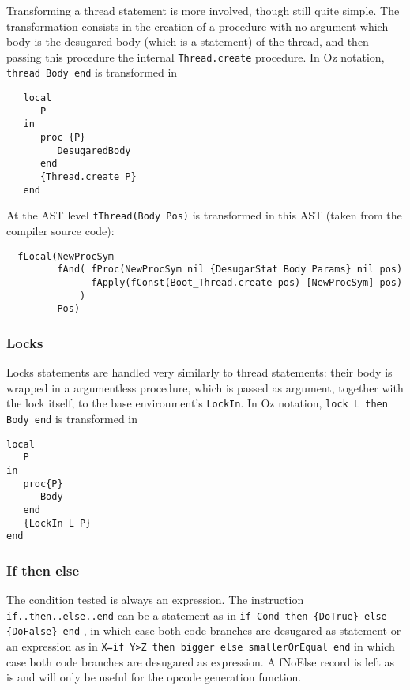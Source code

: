 \documentclass[a4paper]{memoir}
\begin{document}
Transforming a thread statement is more involved, though still quite simple. The transformation consists in the creation of a procedure with no argument which body is the desugared body (which is a statement) of the thread, and then passing this procedure the internal \lstinline!Thread.create! procedure.
In Oz notation, \lstinline!thread Body end! is transformed in 
\begin{lstlisting}
   local 
      P 
   in 
      proc {P} 
         DesugaredBody 
      end 
      {Thread.create P}
   end
\end{lstlisting}
At the AST level \lstinline!fThread(Body Pos)! is transformed in this AST (taken from the compiler source code):
\begin{lstlisting}
  fLocal(NewProcSym 
         fAnd( fProc(NewProcSym nil {DesugarStat Body Params} nil pos) 
               fApply(fConst(Boot_Thread.create pos) [NewProcSym] pos)
             ) 
         Pos)
\end{lstlisting}

\subsubsection{Locks}
Locks statements are handled very similarly to thread statements: their body is
wrapped in a argumentless procedure, which is passed as argument, together with
the lock itself, to the base environment's \lstinline!LockIn!. In Oz notation, \lstinline!lock L then Body end! is transformed in
\begin{lstlisting}
local
   P
in
   proc{P}
      Body
   end
   {LockIn L P}
end
\end{lstlisting}


\subsubsection{If then else}
The condition tested is always an expression.
The instruction \lstinline!if..then..else..end! can be a statement as in 
\lstinline!if Cond then {DoTrue} else {DoFalse} end!
, in which case both code branches are desugared as statement
or an expression as in
\lstinline!X=if Y>Z then bigger else smallerOrEqual end!
in which case both code branches are desugared as expression.
A fNoElse record is left as is and will only be useful for the opcode generation function.
\end{document}
